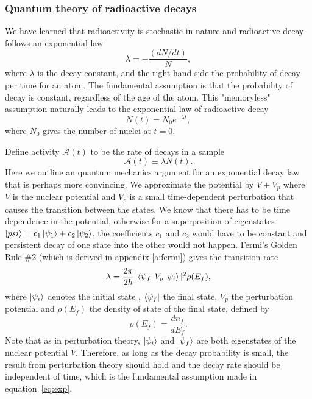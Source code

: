 \documentclass[preprint,aip,cha]{revtex4-1}
\begin{document}
        \subsubsection{Quantum theory of radioactive decays}
        We have learned that radioactivity is stochastic in nature and radioactive decay follows
        an exponential law
        \begin{equation} \label{eq:exp}
            \lambda = -\frac{(dN/dt)}{N},
        \end{equation}
        where $\lambda$ is the decay constant, and the right hand side the probability of decay
        per time for an atom. The fundamental assumption is that the probability of decay is constant,
        regardless of the age of the atom. This "memoryless" assumption naturally leads to the
        exponential law of radioactive decay
        \begin{equation}
            N(t) = N_0 e^{-\lambda t},
        \end{equation}
        where $N_0$ gives the number of nuclei at $t=0$.

        Define activity $\mathcal{A}(t)$ to be the rate of decays in a sample
        \begin{equation} \label{eq:act}
            \mathcal{A}(t)\equiv \lambda N(t).
        \end{equation}
        Here we outline an quantum mechanics argument for an exponential decay law that is perhaps more
        convincing.
        We approximate the potential by $V+V_p$ where $V$ is the nuclear potential and $V_p$ is a small
        time-dependent perturbation that causes the transition between the states. We know that there has
        to be time dependence in the potential, otherwise for a superposition of eigenstates
        $\ket{psi}=c_1\ket{\psi_1} + c_2\ket{\psi_2}$, the coefficients $c_1$ and $c_2$ would 
        have to be constant and
        persistent decay of one state into the other would not happen.
        Fermi's Golden Rule \#2 (which is derived in appendix \ref{a:fermi})
        gives the transition rate
        \begin{equation}
            \lambda = \frac{2\pi}{2\hbar}|\bra{\psi_f}V_p\ket{\psi_i}|^2\rho(E_f),
        \end{equation}
        where $\ket{\psi_i}$ denotes the initial state , $\bra{\psi_f}$ the final state, $V_p$ the perturbation
        potential and $\rho(E_f)$ the density of state of the final state, defined by
        \begin{equation}
            \rho(E_f) = \frac{dn_f}{dE_f}.
        \end{equation}
        Note that as in perturbation theory, $\ket{\psi_i}$ and
        $\ket{\psi_f}$ are both eigenstates of the nuclear potential $V$. Therefore, as long as
        the decay probability is small, the result from perturbation theory should hold and the
        decay rate should be independent of time, which is the fundamental assumption made in
        equation~\ref{eq:exp}.
\end{document}
